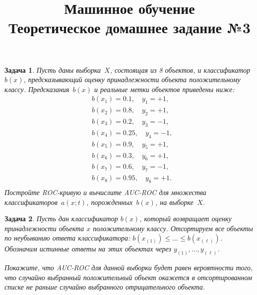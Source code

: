 \documentclass[12pt,fleqn]{article}
\newtheorem{esProblem}{Задача}
\begin{document}
\title{Машинное обучение\\Теоретическое домашнее задание №3}
\date{}
\author{}
\maketitle

\begin{esProblem}
		Пусть даны выборка~$X$, состоящая из 8 объектов, и классификатор~$b(x)$, предсказывающий оценку принадлежности объекта положительному классу. Предсказания~$b(x)$ и реальные метки объектов приведены ниже:
		\begin{align*}
			&b(x_1) = 0.1, \quad  y_1 = +1,\\
			&b(x_2) = 0.8, \quad y_2 = +1,\\
			&b(x_3) = 0.2, \quad y_3 = -1,\\
			&b(x_4) = 0.25, \quad y_4 = -1,\\
			&b(x_5) = 0.9, \quad y_5 = +1,\\
			&b(x_6) = 0.3, \quad y_6 = +1,\\
			&b(x_7) = 0.6, \quad y_7 = -1,\\
			&b(x_8) = 0.95, \quad y_8 = +1.\\
		\end{align*}
    Постройте ROC-кривую и вычислите AUC-ROC для множества классификаторов~$a(x;t)$, порожденных~$b(x)$, на выборке~$X$.

\end{esProblem}

\begin{esProblem}
	Пусть дан  классификатор $b(x)$, который возвращает оценку принадлежности объекта $x$ положительному классу. Отсортируем все объекты по неубыванию ответа классификатора: $b(x_{(1)}) \le \dots \le b(x_{(\ell)})$. Обозначим истинные ответы на этих объектах через $y_{(1)}, \dots, y_{(\ell)}$.
	
	Покажите, что AUC-ROC для данной выборки будет равен вероятности того, что случайно выбранный положительный объект окажется в отсортированном списке не раньше случайно выбранного отрицательного объекта.

\end{esProblem}
\end{document}
